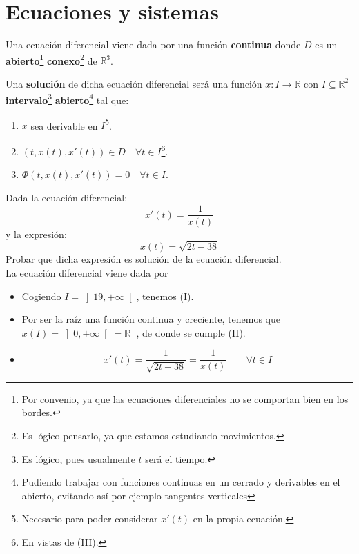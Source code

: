 \newpage
\chapter{Ecuaciones y sistemas}

\begin{definicion}
    Una ecuación diferencial viene dada por una función
    \textbf{continua} donde $D$ es un \textbf{abierto}\footnote{Por convenio, ya que las ecuaciones diferenciales no se comportan bien en los bordes.} \textbf{conexo}\footnote{Es lógico pensarlo, ya que estamos estudiando movimientos.} de $\mathbb{R}^3$.

\noindent
Una \textbf{solución} de dicha ecuación diferencial será una función $x:I\rightarrow\mathbb{R}$ con $I\subseteq \mathbb{R}^2$ \textbf{intervalo}\footnote{Es lógico, pues usualmente $t$ será el tiempo.} \textbf{abierto}\footnote{Pudiendo trabajar con funciones continuas en un cerrado y derivables en el abierto, evitando así por ejemplo tangentes verticales} tal que:
\begin{enumerate}[label= (\roman*)]
    \item $x$ sea derivable en $I$\footnote{Necesario para poder considerar $x'(t)$ en la propia ecuación.}.
    \item $(t,x(t),x'(t)) \in D \quad\forall t\in I$\footnote{En vistas de (III).}.
    \item $\Phi(t,x(t),x'(t))=0 \quad \forall t\in I$.
\end{enumerate}
\end{definicion}

\begin{ejemplo}
    Dada la ecuación diferencial:
    \begin{equation*}
        x'(t) = \dfrac{1}{x(t)}
    \end{equation*}
    y la expresión:
    \begin{equation*}
        x(t) = \sqrt{2t-38}
    \end{equation*}
    Probar que dicha expresión es solución de la ecuación diferencial.\\

    La ecuación diferencial viene dada por
    \begin{itemize}
        \item Cogiendo $I = \left]19, +\infty\right[$, tenemos (I).
        \item Por ser la raíz una función continua y creciente, tenemos que ${x(I) = \left]0,+\infty\right[=\mathbb{R}^+}$, de donde se cumple (II).
        \item 
            \begin{equation*}
                x'(t) = \dfrac{1}{\sqrt{2t-38}} = \dfrac{1}{x(t)} \qquad \forall t\in I
            \end{equation*}
    \end{itemize}
\end{ejemplo}

